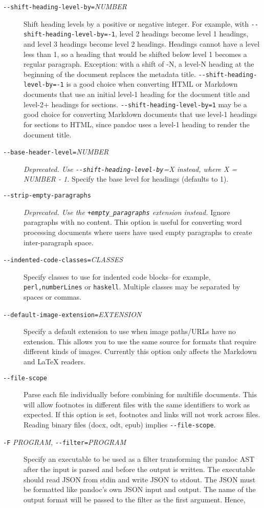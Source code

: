 \documentclass[]{article}
\begin{document}
\begin{description}
\item[\texttt{-\/-shift-heading-level-by=}\emph{NUMBER}]
Shift heading levels by a positive or negative integer. For example,
with \texttt{-\/-shift-heading-level-by=-1}, level 2 headings become
level 1 headings, and level 3 headings become level 2 headings. Headings
cannot have a level less than 1, so a heading that would be shifted
below level 1 becomes a regular paragraph. Exception: with a shift of
-N, a level-N heading at the beginning of the document replaces the
metadata title. \texttt{-\/-shift-heading-level-by=-1} is a good choice
when converting HTML or Markdown documents that use an initial level-1
heading for the document title and level-2+ headings for sections.
\texttt{-\/-shift-heading-level-by=1} may be a good choice for
converting Markdown documents that use level-1 headings for sections to
HTML, since pandoc uses a level-1 heading to render the document title.
\item[\texttt{-\/-base-header-level=}\emph{NUMBER}]
\emph{Deprecated. Use \texttt{-\/-shift-heading-level-by}=X instead,
where X = NUMBER - 1.} Specify the base level for headings (defaults to
1).
\item[\texttt{-\/-strip-empty-paragraphs}]
\emph{Deprecated. Use the \texttt{+empty\_paragraphs} extension
instead.} Ignore paragraphs with no content. This option is useful for
converting word processing documents where users have used empty
paragraphs to create inter-paragraph space.
\item[\texttt{-\/-indented-code-classes=}\emph{CLASSES}]
Specify classes to use for indented code blocks--for example,
\texttt{perl,numberLines} or \texttt{haskell}. Multiple classes may be
separated by spaces or commas.
\item[\texttt{-\/-default-image-extension=}\emph{EXTENSION}]
Specify a default extension to use when image paths/URLs have no
extension. This allows you to use the same source for formats that
require different kinds of images. Currently this option only affects
the Markdown and LaTeX readers.
\item[\texttt{-\/-file-scope}]
Parse each file individually before combining for multifile documents.
This will allow footnotes in different files with the same identifiers
to work as expected. If this option is set, footnotes and links will not
work across files. Reading binary files (docx, odt, epub) implies
\texttt{-\/-file-scope}.
\item[\texttt{-F} \emph{PROGRAM}, \texttt{-\/-filter=}\emph{PROGRAM}]
Specify an executable to be used as a filter transforming the pandoc AST
after the input is parsed and before the output is written. The
executable should read JSON from stdin and write JSON to stdout. The
JSON must be formatted like pandoc's own JSON input and output. The name
of the output format will be passed to the filter as the first argument.
Hence,


\end{description}
\end{document}
